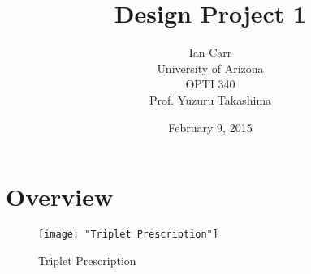 \documentclass{article}
\begin{document}
\title{Design Project 1}
\author{Ian Carr\\
	University of Arizona\\
	OPTI 340\\
	Prof. Yuzuru Takashima}
\date{February 9, 2015}
\maketitle

\newpage


\listoffigures 

\section*{Overview}


\newpage

\begin{figure}[H]
	\texttt{[image: "Triplet Prescription"]}
	\centering
	\caption{Triplet Prescription}
	\centering
\end{figure}
\end{document}
